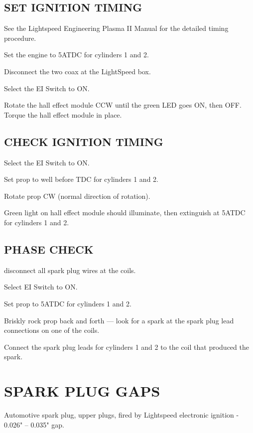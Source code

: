 \subsection{SET IGNITION TIMING} 
\begin{enumerate*}
	\item See the Lightspeed Engineering Plasma II Manual for the detailed timing procedure. 
	\item Set the engine to 5\textdegree ATDC for cylinders 1 and 2.
	\item Disconnect the two coax at the LightSpeed box.
	\item Select the EI Switch to ON.
	\item Rotate the hall effect module CCW until the green LED goes ON, then OFF. Torque the hall effect module in place.
\end{enumerate*}
\subsection{CHECK IGNITION TIMING} 
\begin{enumerate*}
	\item Select the EI Switch to ON.
	\item Set prop to well before TDC for cylinders 1 and 2.
	\item Rotate prop CW (normal direction of rotation).
	\item Green light on hall effect module should illuminate, then extinguish at 5\textdegree ATDC for cylinders 1 and 2.
\end{enumerate*}

  \subsection{PHASE CHECK} 
  \begin{enumerate*}
  	\item disconnect all spark plug wires at the coils. 
  	\item Select EI Switch to ON. 
  	\item Set prop to 5\textdegree ATDC for cylinders 1 and 2. 
  	\item Briskly rock prop back and forth --- look for a spark at the spark plug lead connections on one of the coils. 
  	\item Connect the spark plug leads for cylinders 1 and 2 to the coil that produced the spark.
\end{enumerate*}

\section{SPARK PLUG GAPS}
Automotive spark plug, upper plugs, fired by Lightspeed electronic ignition - 0.026" -- 0.035" gap.

